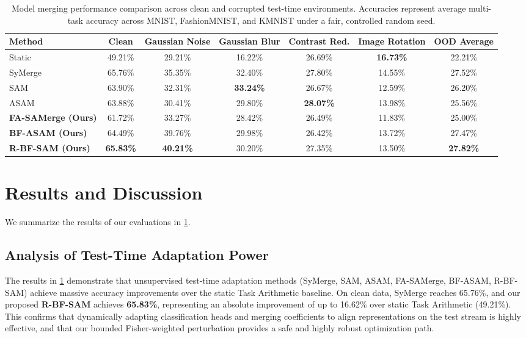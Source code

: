 \documentclass{article}
\theoremstyle{plain}
\theoremstyle{definition}
\theoremstyle{remark}
\begin{document}
\begin{table}[t]
\caption{Model merging performance comparison across clean and corrupted test-time environments. Accuracies represent average multi-task accuracy across MNIST, FashionMNIST, and KMNIST under a fair, controlled random seed.}
\label{tab:results}
\vskip 0.15in
\begin{center}
\begin{small}
\begin{sc}
\setlength{\tabcolsep}{5pt}
\begin{tabular}{lcccccc}
\toprule
Method & Clean & Gaussian Noise & Gaussian Blur & Contrast Red. & Image Rotation & OOD Average \\
\midrule
Static & 49.21\% & 29.21\% & 16.22\% & 26.69\% & \textbf{16.73\%} & 22.21\% \\
SyMerge & 65.76\% & 35.35\% & 32.40\% & 27.80\% & 14.55\% & 27.52\% \\
SAM & 63.90\% & 32.31\% & \textbf{33.24\%} & 26.67\% & 12.59\% & 26.20\% \\
ASAM & 63.88\% & 30.41\% & 29.80\% & \textbf{28.07\%} & 13.98\% & 25.56\% \\
\midrule
\textbf{FA-SAMerge (Ours)} & 61.72\% & 33.27\% & 28.42\% & 26.49\% & 11.83\% & 25.00\% \\
\textbf{BF-ASAM (Ours)} & 64.49\% & 39.76\% & 29.98\% & 26.42\% & 13.72\% & 27.47\% \\
\textbf{R-BF-SAM (Ours)} & \textbf{65.83\%} & \textbf{40.21\%} & 30.20\% & 27.35\% & 13.50\% & \textbf{27.82\%} \\
\bottomrule
\end{tabular}
\end{sc}
\end{small}
\end{center}
\vskip -0.1in
\end{table}

\section{Results and Discussion}
\label{sec:results}
We summarize the results of our evaluations in \cref{tab:results}.

\subsection{Analysis of Test-Time Adaptation Power}
The results in \cref{tab:results} demonstrate that unsupervised test-time adaptation methods (SyMerge, SAM, ASAM, FA-SAMerge, BF-ASAM, R-BF-SAM) achieve massive accuracy improvements over the static Task Arithmetic baseline. On clean data, SyMerge reaches 65.76\%, and our proposed \textbf{R-BF-SAM} achieves \textbf{65.83\%}, representing an absolute improvement of up to 16.62\% over static Task Arithmetic (49.21\%). This confirms that dynamically adapting classification heads and merging coefficients to align representations on the test stream is highly effective, and that our bounded Fisher-weighted perturbation provides a safe and highly robust optimization path.
\end{document}
